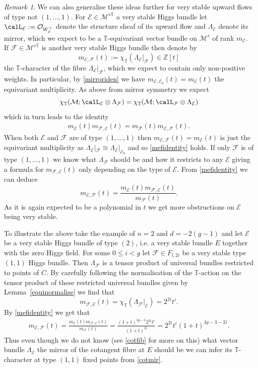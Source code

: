 \documentclass[12pt]{article}
\numberwithin{equation}{section}
\theoremstyle{remark}
\newtheorem{remark}[theorem]{Remark}
\theoremstyle{definition}
\numberwithin{theorem}{section}
\def\beq{\begin{eqnarray}}
\def\eeq{\end{eqnarray}}
\def\calE{{\mathcal E}}
\def\M{{\mathcal{M}}}
\def\calF{{\mathcal{F}}}
\newcommand{\T}{{\mathbb{T}}}
\def\calO{{\mathcal O}}
\def\Z{\mathbb{Z}}
\renewcommand{\1}{\mathbbm{1}}
\begin{document}
\begin{remark} We can also generalise these ideas further for very stable upward flows of type not $(1,\dots,1)$. For  $\calE\in \M^{s\T}$  a very stable Higgs bundle let $\calL_\calE:=\calO_{W^+_\calE}$ denote the structure sheaf of its upward flow and  $\Lambda_\calE$   denote its mirror, which we expect to be a $\T$-equivariant vector bundle on $\M^s$ of rank $m_\calE$. If $\calF\in \M^{s\T}$ is another very stable Higgs bundle then denote by $$m_{\calE,\calF}(t):=\chi_\T(\Lambda_\calE|_\calF)\in \Z[t]$$ the $\T$-character  of the fibre $\Lambda_\calE|_\calF$, which we expect to contain only non-positive weights. In particular,  by \eqref{mirroriden} we have $m_{\calE,\calE_0}(t)= m_\calE(t)$ the equivariant multiplicity. As above from mirror symmetry we expect $$\chi_\T(\M;\calL_\calE\otimes \Lambda_\calF)=\chi_\T(\M;\calL_\calF\otimes \Lambda_\calE)$$ which in turn leads to the identity
	\beq\label{mefidentity} m_\calE(t) m_{\calF,\calE}(t)=m_\calF(t) m_{\calE,\calF}(t).\eeq When both $\calE$ and $\calF$ are of type $(1,\dots,1)$ then $m_{\calE,\calF}(t)=m_\calE(t)$ is just the equivariant multiplicity as $\Lambda_\calE|_{\calF}\cong \Lambda_\calE|_{\calE_0}$  and so \eqref{mefidentity} holds. If only $\calF$ is of type $(1,\dots,1)$ we know what $\Lambda_\calF$ should be and how it restricts to any $\calE$ giving a formula for $m_{\calF,\calE}(t)$ only depending on the type of $\calE$. From \eqref{mefidentity} we can deduce $$m_{\calE,\calF}(t)=\frac{m_\calE(t) m_{\calF,\calE}(t)}{m_\calF(t)}.$$ As it is again expected to be a polynomial in $t$ we get more obstructions on $\calE$ being very stable. 
	
	To illustrate the above take the example of $n=2$ and $d=-2(g-1)$ and let $\calE$ be a very stable Higgs bundle of type $(2)$, i.e. a very stable bundle $E$ together with the zero Higgs field. For some $0\leq i<g$ let $\calF\in F_{l,2i}$ be a very stable type $(1,1)$ Higgs bundle. Then $\Lambda_\calF$ is a tensor product of universal bundles restricted to points of $C$.  By carefully following the normalisation of the $\T$-action on the tensor product of these restricted  universal bundles given by Lemma~\ref{equinormalise} we find that 
	$$m_{\calF,\calE}(t)=\chi_\T(\Lambda_\calF|_\calE)=2^{2i}t^i .$$ By \eqref{mefidentity} we get that
	\beq \label{cotmir} m_{\calE,\calF}(t)=\frac{m_\calE(t) m_{\calF,\calE}(t)}{m_\calF(t)}=\frac{(1+t)^{3g-3} 2^{2i}t^i}{(1+t)^{2i}}=2^{2i}t^i(1+t)^{3g-3-2i}.\eeq Thus even though we do not know (see \ref{cotfib} for more on this) what vector bundle $\Lambda_\calE$ the mirror of the cotangent fibre at $E$  should be we can infer its $\T$-character at type $(1,1)$ fixed points  from \eqref{cotmir}. 
	
	
\end{remark}
\end{document}
